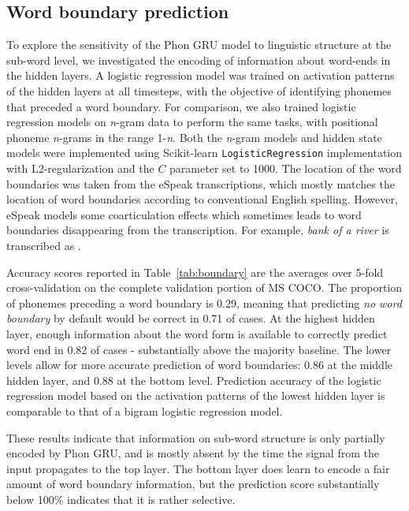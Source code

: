 
\subsection{Word boundary prediction}
To explore the sensitivity of the {\sc Phon GRU} model to linguistic structure at the sub-word level, we investigated the encoding of information about word-ends in the hidden layers. A logistic regression model was trained on activation patterns of the hidden layers at all timesteps, with the objective of identifying phonemes that preceded a word boundary. For comparison, we also trained logistic regression models on \textit{n}-gram data to perform the same tasks, with positional phoneme \textit{n}-grams in the range 1-\textit{n}. Both the \textit{n}-gram models and hidden state models were implemented using Scikit-learn \cite{scikit-learn} {\tt LogisticRegression} implementation with L2-regularization and the $C$ parameter set to 1000. The location of the word boundaries was taken from the eSpeak transcriptions, which mostly matches the location of word boundaries according to conventional English spelling. However, eSpeak models some coarticulation effects which sometimes leads to word boundaries disappearing from the transcription. For example, {\it bank of a river} is transcribed as .

Accuracy scores reported in Table~\ref{tab:boundary} are the averages over 5-fold cross-validation on the complete validation portion of MS COCO. The proportion of phonemes preceding a word boundary is 0.29, meaning that predicting {\it no word boundary} by default would be correct in 0.71 of cases. At the highest hidden layer, enough information about the word form is available to correctly predict word end in 0.82 of cases - substantially above the majority baseline. The lower levels allow for more accurate prediction of word boundaries: 0.86 at the middle hidden layer, and 0.88 at the bottom level. 
Prediction accuracy of the logistic regression model based on the activation patterns of the lowest hidden layer is comparable to that of a bigram logistic regression model.

These results indicate that information on sub-word structure is only partially encoded by {\sc Phon GRU}, and is mostly absent by the time the signal from the input propagates to the top layer. The bottom layer does learn to encode a fair amount of word boundary information, but the prediction score substantially below 100\% indicates that it is rather selective. 

